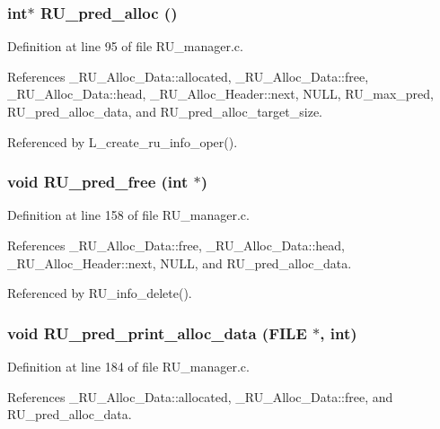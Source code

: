 \subsubsection{\setlength{\rightskip}{0pt plus 5cm}int$\ast$ RU\_\-pred\_\-alloc ()}\label{RU__manager_8h_34fc03b647d985f62071736581eeada0}




Definition at line 95 of file RU\_\-manager.c.

References \_\-RU\_\-Alloc\_\-Data::allocated, \_\-RU\_\-Alloc\_\-Data::free, \_\-RU\_\-Alloc\_\-Data::head, \_\-RU\_\-Alloc\_\-Header::next, NULL, RU\_\-max\_\-pred, RU\_\-pred\_\-alloc\_\-data, and RU\_\-pred\_\-alloc\_\-target\_\-size.

Referenced by L\_\-create\_\-ru\_\-info\_\-oper().
\subsubsection{\setlength{\rightskip}{0pt plus 5cm}void RU\_\-pred\_\-free (int $\ast$)}\label{RU__manager_8h_c1b4744f4c28256aeb105fe6936f5e24}




Definition at line 158 of file RU\_\-manager.c.

References \_\-RU\_\-Alloc\_\-Data::free, \_\-RU\_\-Alloc\_\-Data::head, \_\-RU\_\-Alloc\_\-Header::next, NULL, and RU\_\-pred\_\-alloc\_\-data.

Referenced by RU\_\-info\_\-delete().
\subsubsection{\setlength{\rightskip}{0pt plus 5cm}void RU\_\-pred\_\-print\_\-alloc\_\-data (FILE $\ast$, int)}\label{RU__manager_8h_0c23eb2d3930233b1d9a4b62b9454f55}




Definition at line 184 of file RU\_\-manager.c.

References \_\-RU\_\-Alloc\_\-Data::allocated, \_\-RU\_\-Alloc\_\-Data::free, and RU\_\-pred\_\-alloc\_\-data.

